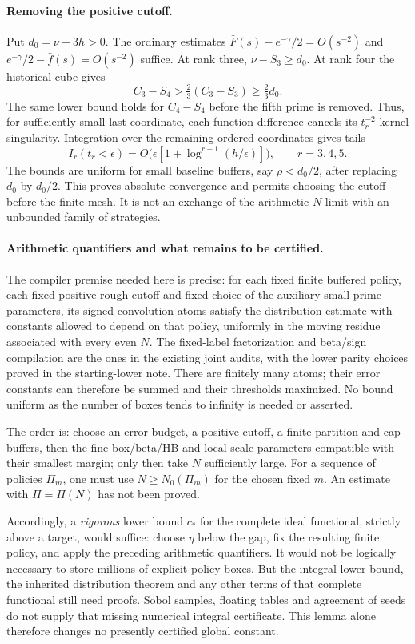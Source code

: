\paragraph{Removing the positive cutoff.}
Put $d_0=\nu-3h>0$. The ordinary estimates
$\bar F(s)-e^{-\gamma}/2=O(s^{-2})$ and
$e^{-\gamma}/2-\bar f(s)=O(s^{-2})$ suffice. At rank three,
$\nu-S_3\ge d_0$. At rank four the historical cube gives
\[
 C_3-S_4>\tfrac23(C_3-S_3)\ge\tfrac23d_0.
\]
The same lower bound holds for $C_4-S_4$ before the fifth prime
is removed. Thus, for sufficiently small last coordinate, each
function difference cancels its $t_r^{-2}$ kernel singularity.
Integration over the remaining ordered coordinates gives tails
\[
 I_r(t_r<\epsilon)
   =O\bigl(\epsilon[1+\log^{r-1}(h/\epsilon)]\bigr),
 \qquad r=3,4,5.
\]
The bounds are uniform for small baseline buffers, say
$\rho<d_0/2$, after replacing $d_0$ by $d_0/2$.
This proves absolute convergence and permits choosing the cutoff
before the finite mesh. It is not an exchange of the arithmetic
$N$ limit with an unbounded family of strategies.

\paragraph{Arithmetic quantifiers and what remains to be certified.}
The compiler premise needed here is precise: for each fixed finite
buffered policy, each fixed positive rough cutoff and fixed choice
of the auxiliary small-prime parameters, its signed convolution
atoms satisfy the distribution estimate with constants allowed to
depend on that policy, uniformly in the moving residue associated
with every even $N$. The fixed-label factorization and beta/sign
compilation are the ones in the existing joint audits, with the
lower parity choices proved in the starting-lower note. There are
finitely many atoms; their error constants can therefore be summed
and their thresholds maximized. No bound uniform as the number of
boxes tends to infinity is needed or asserted.

The order is: choose an error budget, a positive cutoff, a finite
partition and cap buffers, then the fine-box/beta/HB and local-scale
parameters compatible with their smallest margin; only then take
$N$ sufficiently large. For a sequence of policies $\Pi_m$, one
must use $N\ge N_0(\Pi_m)$ for the chosen fixed $m$. An estimate
with $\Pi=\Pi(N)$ has not been proved.

Accordingly, a \emph{rigorous} lower bound $c_*$ for the complete
ideal functional, strictly above a target, would suffice: choose
$\eta$ below the gap, fix the resulting finite policy, and apply
the preceding arithmetic quantifiers. It would not be logically
necessary to store millions of explicit policy boxes. But the
integral lower bound, the inherited distribution theorem and any
other terms of that complete functional still need proofs.
Sobol samples, floating tables and agreement of seeds do not supply
that missing numerical integral certificate. This lemma alone
therefore changes no presently certified global constant.

